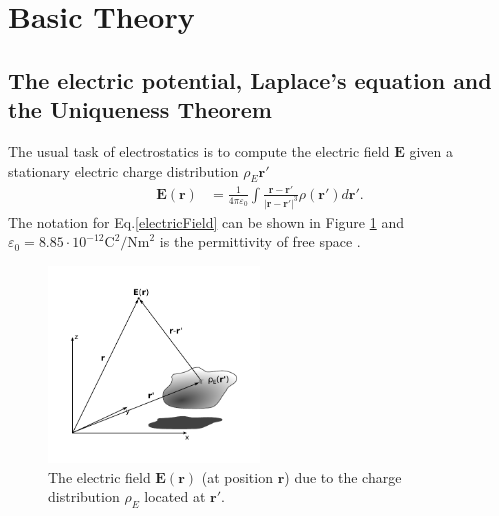 \section{Basic Theory}
\subsection{The electric potential, Laplace's equation and the Uniqueness Theorem}
The usual task of electrostatics is to compute the electric field $\boldsymbol{E}$ given a 
stationary electric charge distribution $\rho_E{\boldsymbol{r'}}$
\begin{align}
   \label{electricField}
   \boldsymbol{E}(\boldsymbol{r}) 
   &= \frac{1}{4 \pi \varepsilon_0} \int \frac{\boldsymbol{r} - \boldsymbol{r'}}
                                              {\big|\boldsymbol{r} - \boldsymbol{r'}\big|^3} 
                                                           \rho(\boldsymbol{r'}) d\!\boldsymbol{r'}.
\end{align}
The notation for Eq.\eqref{electricField} can be shown in Figure \ref{fig:electricField}
and $\varepsilon_0 = 8.85 \cdot 10 ^{-12} \text{C}^2/\text{Nm}^2$ is the permittivity of free space
\cite[.~58-62]{Griffiths}.
%
\begin{figure}[h!]
  \centering
   \includegraphics[width=0.5\textwidth]{Figures/electricFieldcoord.pdf}
   \caption{
      The electric field $\boldsymbol E (\boldsymbol r)$ (at position $\boldsymbol r$)
      due to the charge distribution $\rho_E$ located at $\boldsymbol{r'}$.
   }
   \label{fig:electricField}
\end{figure}
